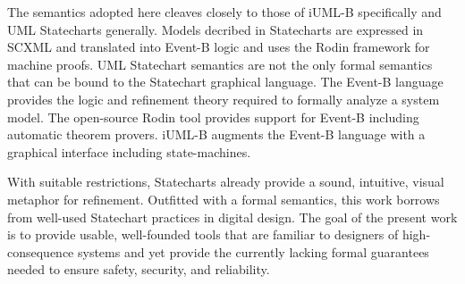 The semantics adopted here cleaves closely to those of iUML-B
specifically and UML Statecharts\cite{Alexandre} generally. Models
decribed in Statecharts are expressed in SCXML and translated into
Event-B logic and uses the Rodin framework\cite{Abrial} for machine
proofs.  UML Statechart semantics are not the only formal semantics that can be bound to the Statechart graphical language\cite{Eshuis_2009}.
%
The Event-B language
\cite{abrial10:_model_event_b} provides the logic and refinement
theory required to formally analyze a system model.  The open-source
Rodin tool \cite{abrial10:_rodin} provides support for Event-B
including automatic theorem provers.  iUML-B \cite{snook14:_b_statem}
augments the Event-B language with a graphical interface including
state-machines.  

With suitable restrictions, Statecharts already provide a sound,
intuitive, visual metaphor for refinement. Outfitted with a formal
semantics, this work borrows from well-used Statechart practices in
digital design.  The goal of the present work is to provide usable,
well-founded tools that are familiar to designers of high-consequence
systems and yet provide the currently lacking formal guarantees needed
to ensure safety, security, and reliability.
